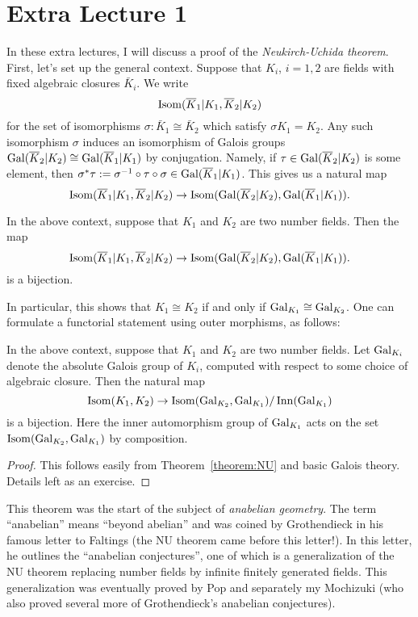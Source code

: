 \section{Extra Lecture 1}

In these extra lectures, I will discuss a proof of the \emph{Neukirch-Uchida theorem}.
First, let's set up the general context.
Suppose that $K_{i}$, $i = 1,2$ are fields with fixed algebraic closures $\bar K_{i}$.
We write
\[ \operatorname{Isom}(\overline K_{1}|K_{1},\overline K_{2}|K_{2}) \]
for the set of isomorphisms $\sigma : \bar K_{1} \cong \bar K_{2}$ which satisfy $\sigma K_{1} = K_{2}$.
Any such isomorphism $\sigma$ induces an isomorphism of Galois groups $\operatorname{Gal}(\overline K_{2}|K_{2}) \cong \operatorname{Gal}(\overline K_{1}|K_{1})$ by conjugation.
Namely, if $\tau \in \operatorname{Gal}(\overline K_{2}|K_{2})$ is some element, then $\sigma^{*} \tau := \sigma^{-1} \circ \tau \circ \sigma \in \operatorname{Gal}(\overline K_{1}|K_{1})$.
This gives us a natural map
\[ \operatorname{Isom}(\overline K_{1}|K_{1},\overline K_{2}|K_{2}) \to \operatorname{Isom}(\operatorname{Gal}(\overline K_{2}|K_{2}),\operatorname{Gal}(\overline K_{1}|K_{1})). \]

\begin{theorem}\label{theorem:NU}
  In the above context, suppose that $K_{1}$ and $K_{2}$ are two number fields.
  Then the map
  \[ \operatorname{Isom}(\overline K_{1}|K_{1},\overline K_{2}|K_{2}) \to \operatorname{Isom}(\operatorname{Gal}(\overline K_{2}|K_{2}),\operatorname{Gal}(\overline K_{1}|K_{1})). \]
  is a bijection.
\end{theorem}

In particular, this shows that $K_{1} \cong K_{2}$ if and only if $\operatorname{Gal}_{K_{1}} \cong \operatorname{Gal}_{K_{2}}$.
One can formulate a functorial statement using outer morphisms, as follows:
\begin{theorem}
  In the above context, suppose that $K_{1}$ and $K_{2}$ are two number fields.
  Let $\operatorname{Gal}_{K_{i}}$ denote the absolute Galois group of $K_{i}$, computed with respect to some choice of algebraic closure.
  Then the natural map
  \[ \operatorname{Isom}(K_{1},K_{2}) \to \operatorname{Isom}(\operatorname{Gal}_{K_{2}},\operatorname{Gal}_{K_{1}})/\operatorname{Inn}(\operatorname{Gal}_{K_{1}}) \]
  is a bijection.
  Here the inner automorphism group of $\operatorname{Gal}_{K_{1}}$ acts on the set $\operatorname{Isom}(\operatorname{Gal}_{K_{2}},\operatorname{Gal}_{K_{1}})$ by composition.
\end{theorem}
\begin{proof}
  This follows easily from Theorem~\ref{theorem:NU} and basic Galois theory.
  Details left as an exercise.
\end{proof}

\begin{remark}
  This theorem was the start of the subject of \emph{anabelian geometry}.
  The term ``anabelian'' means ``beyond abelian'' and was coined by Grothendieck in his famous letter to Faltings (the NU theorem came before this letter!).
  In this letter, he outlines the ``anabelian conjectures'', one of which is a generalization of the NU theorem replacing number fields by infinite finitely generated fields.
  This generalization was eventually proved by Pop and separately my Mochizuki (who also proved several more of Grothendieck's anabelian conjectures).
\end{remark}

